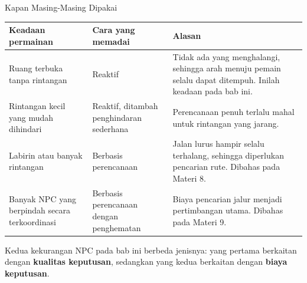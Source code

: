 \documentclass[aspectratio=169,10pt]{beamer}
\begin{document}
\begin{frame}{Kapan Masing-Masing Dipakai}
{\scriptsize
\renewcommand{\arraystretch}{1.10}
\begin{tabularx}{\textwidth}{@{}>{\raggedright\arraybackslash}p{4.6cm}
    >{\raggedright\arraybackslash}p{3.4cm}
    >{\raggedright\arraybackslash}X@{}}
\toprule
\textbf{Keadaan permainan} & \textbf{Cara yang memadai} & \textbf{Alasan} \\
\midrule
Ruang terbuka tanpa rintangan & Reaktif &
  Tidak ada yang menghalangi, sehingga arah menuju pemain selalu dapat
  ditempuh. Inilah keadaan pada bab ini. \\
\addlinespace
Rintangan kecil yang mudah dihindari & Reaktif, ditambah penghindaran
  sederhana &
  Perencanaan penuh terlalu mahal untuk rintangan yang jarang. \\
\addlinespace
Labirin atau banyak rintangan & Berbasis perencanaan &
  Jalan lurus hampir selalu terhalang, sehingga diperlukan pencarian rute.
  Dibahas pada Materi 8. \\
\addlinespace
Banyak NPC yang berpindah secara terkoordinasi & Berbasis perencanaan dengan
  penghematan &
  Biaya pencarian jalur menjadi pertimbangan utama. Dibahas pada Materi 9. \\
\bottomrule
\end{tabularx}}
\vspace{0.14cm}
\begin{kotak}
Kedua kekurangan NPC pada bab ini berbeda jenisnya: yang pertama berkaitan
dengan \textbf{kualitas keputusan}, sedangkan yang kedua berkaitan dengan
\textbf{biaya keputusan}.
\end{kotak}
\end{frame}
\end{document}
